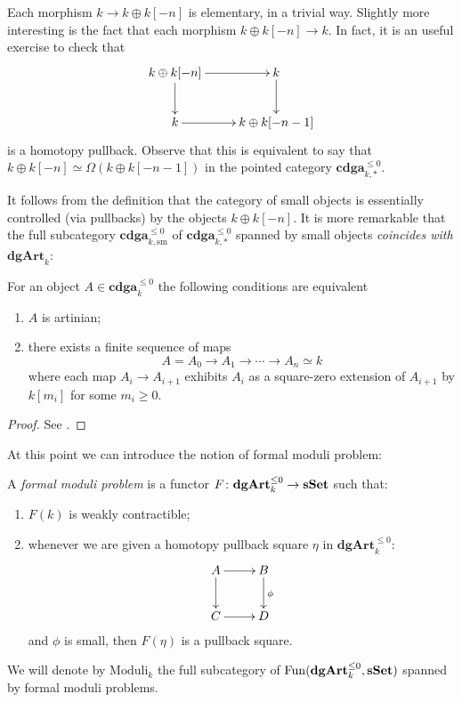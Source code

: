 \begin{refsection}
\begin{eg} \label{eg elementary morphisms}
Each morphism $k \to k \oplus k[-n]$ is elementary, in a trivial way. Slightly more interesting is the fact that each morphism $k \oplus k[-n] \to k$. In fact, it is an useful exercise to check that
\[
\xymatrix{
k \oplus k[-n] \ar[r] \ar[d] & k \ar[d] \\ k \ar[r] & k \oplus k[-n-1]
}
\]
is a homotopy pullback. Observe that this is equivalent to say that $k \oplus k[-n] \simeq \Omega( k \oplus k[-n-1])$ in the pointed category $\mathbf{cdga}_{k,*}^{\le 0}$.
\end{eg}

It follows from the definition that the category of small objects is essentially controlled (via pullbacks) by the objects $k \oplus k[-n]$. It is more remarkable that the full subcategory $\mathbf{cdga}_{k, \mathrm{sm}}^{\le 0}$ of $\mathbf{cdga}_{k,*}^{\le 0}$ spanned by small objects \emph{coincides with $\mathbf{dgArt}_k$}:

\begin{prop} \label{prop characterizing artinians}
For an object $A \in \mathbf{cdga}_k^{\le 0}$ the following conditions are equivalent
\begin{enumerate}
\item $A$ is artinian;
\item there exists a finite sequence of maps
\[
A = A_0 \to A_1 \to \cdots \to A_n \simeq k
\]
where each map $A_i \to A_{i+1}$ exhibits $A_i$ as a square-zero extension of $A_{i+1}$ by $k[m_i]$ for some $m_i \ge 0$.
\end{enumerate}
\end{prop}

\begin{proof}
See \cite[Proposition 1.1.11]{dagx}.
\end{proof}

At this point we can introduce the notion of formal moduli problem:

\begin{defin} \label{def formal moduli}
A \emph{formal moduli problem} is a functor $F \colon \mathbf{dgArt}_k^{\le 0} \to \mathbf{sSet}$ such that:
\begin{enumerate}
\item $F(k)$ is weakly contractible;
\item whenever we are given a homotopy pullback square $\eta$ in $\mathbf{dgArt}_k^{\le 0}$:
\[
\xymatrix{
A \ar[r] \ar[d] & B \ar[d]^\phi \\ C \ar[r] & D
}
\]
and $\phi$ is small, then $F(\eta)$ is a pullback square.
\end{enumerate}
We will denote by $\mathrm{Moduli}_k$ the full subcategory of $\mathrm{Fun}(\mathbf{dgArt}_k^{\le 0}, \mathbf{sSet})$ spanned by formal moduli problems.
\end{defin}


\end{refsection}
